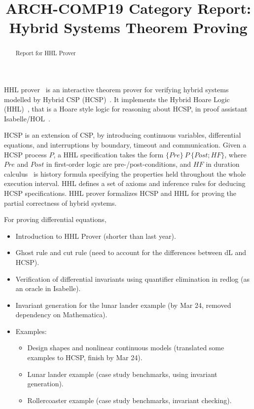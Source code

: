 \documentclass[runningheads,a4paper]{llncs}
\begin{document}
\author{}
\institute{}

\title{ARCH-COMP19 Category Report: Hybrid Systems Theorem Proving}

\maketitle

\begin{abstract}
  Report for HHL Prover
\end{abstract}

HHL prover~\cite{WZZ15} is an interactive theorem prover for verifying hybrid systems modelled by Hybrid CSP (HCSP)~\cite{He94,ZWR96}.
It implements the Hybrid Hoare Logic (HHL)~\cite{LLQZ10}, that is a Hoare style logic for reasoning about HCSP,  in proof assistant Isabelle/HOL~\cite{isabelle}.

HCSP is an extension of CSP, by  introducing continuous variables, differential equations, and interruptions by boundary, timeout and communication.
Given a HCSP process $P$,  a HHL specification takes the form $\{Pre\}~P~\{Post; HF\}$, where
$Pre$ and $Post$ in first-order logic are pre-/post-conditions, and $HF$ in duration calculus~\cite{ZH04} is history formula
specifying the  properties held throughout the whole execution interval. HHL defines a set of axioms and inference rules for deducing HCSP specifications. HHL prover formalizes HCSP and HHL for proving the partial correctness of hybrid systems.

For proving differential equations, 



\begin{itemize}
\item Introduction to HHL Prover (shorter than last year).



\item Ghost rule and cut rule (need to account for the differences
  between dL and HCSP).
\item Verification of differential invariants using quantifier
  elimination in redlog (as an oracle in Isabelle).
\item Invariant generation for the lunar lander example (by Mar 24,
  removed dependency on Mathematica).
\item Examples:
  \begin{itemize}
  \item Design shapes and nonlinear continuous models (translated some
    examples to HCSP, finish by Mar 24).
  \item Lunar lander example (case study benchmarks, using invariant
    generation).
  \item Rollercoaster example (case study benchmarks, invariant
    checking).
  \end{itemize}
\end{itemize}



\end{document}
